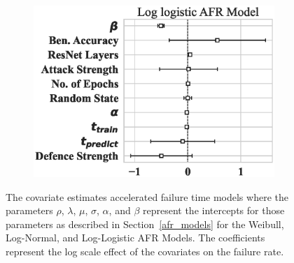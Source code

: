 \begin{figure}
\begin{subfigure}[t]{0.3\textwidth}
        \includegraphics[width=\textwidth]{cifar/log_logistic_aft.eps}
    \end{subfigure}

    \caption{The covariate estimates accelerated failure time models where the parameters $\rho$, $\lambda$, $\mu$, $\sigma$, $\alpha$, and $\beta$ represent the intercepts for those parameters as described in Section~\ref{afr_models} for the Weibull, Log-Normal, and Log-Logistic AFR Models. The coefficients represent the log scale effect of the covariates on the failure rate.}
    \label{fig:cifar/afr_models}
\end{figure}

